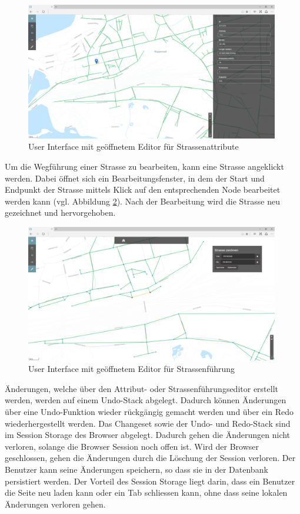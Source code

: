 \begin{figure}[H]
\centering
\includegraphics[height=6cm]{images/EditStreetattributes.png}
\caption{User Interface mit geöffnetem Editor für Strassenattribute}
\label{fig:editstreetattributes}
\end{figure}
\noindent
Um die Wegführung einer Strasse zu bearbeiten, kann eine Strasse angeklickt werden. Dabei öffnet sich ein Bearbeitungsfenster, in dem der Start und Endpunkt der Strasse mittels Klick auf den entsprechenden Node bearbeitet werden kann (vgl. Abbildung \ref{fig:editstreetdirection}). Nach der Bearbeitung wird die Strasse neu gezeichnet und hervorgehoben.\\
\begin{figure}[H]
\centering
\includegraphics[height=6cm]{images/EditStreetdirection.png}
\caption{User Interface mit geöffnetem Editor für Strassenführung}
\label{fig:editstreetdirection}
\end{figure}
\noindent
Änderungen, welche über den Attribut-  oder Strassenführungseditor erstellt werden, werden auf einem Undo-Stack abgelegt. Dadurch können Änderungen über eine Undo-Funktion wieder rückgängig gemacht werden und über ein Redo wiederhergestellt werden. Das Changeset sowie der Undo- und Redo-Stack sind im Session Storage des Browser abgelegt. Dadurch gehen die Änderungen nicht verloren, solange die Browser Session noch offen ist. Wird der Browser geschlossen, gehen die Änderungen durch die Löschung der Session verloren. Der Benutzer kann seine Änderungen speichern, so dass sie in der Datenbank persistiert werden. Der Vorteil des Session Storage liegt darin, dass ein Benutzer die Seite neu laden kann oder ein Tab schliessen kann, ohne dass seine lokalen Änderungen verloren gehen.
